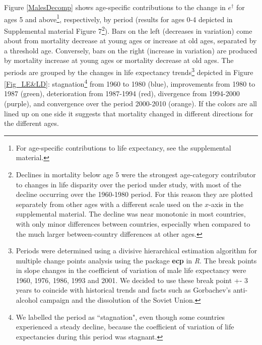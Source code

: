 \documentclass{article}
\begin{document}
\begin{spacing}{1.5}
Figure  \ref{MalesDecomp} shows age-specific contributions to the change in $e^\dagger$ for ages 5 and above\footnote{For age-specific contributions to life expectancy, see the supplemental material.}, respectively, by period (results for ages 0-4 depicted in Supplemental material Figure 7\footnote{Declines in mortality below age 5 were the strongest age-category contributor to changes in life disparity over the period under study, with most of the decline occurring over the 1960-1980 period. For this reason they are plotted separately from other ages with a different scale used on the $x$-axis in the supplemental material. The decline was near monotonic in most countries, with only minor differences between countries, especially when compared to the much larger between-country differences at other ages.}). Bars on the left (decreases in variation) come about from mortality decrease at young ages or increase at old ages, separated by a threshold age. Conversely, bars on the right (increase in variation) are produced by mortality increase at young ages or mortality decrease at old ages. The periods are grouped by the changes in life expectancy trends\footnote{Periods were determined using a divisive hierarchical estimation algorithm for multiple change points analysis using the package \textbf{ecp} in \textit{R}. The break points in slope changes in the coefficient of variation of male life expectancy were 1960, 1976, 1986, 1993 and 2001. We decided to use these break point +- 3 years to coincide with historical trends and facts such as Gorbachev's anti-alcohol campaign and the dissolution of the Soviet Union.} depicted in Figure \ref{Fig_LE&LD}: stagnation\footnote{We labelled the period as ``stagnation", even though some countries experienced a steady decline, because the coefficient of variation of life expectancies during this period was stagnant.} from 1960 to 1980 (blue), improvements from 1980 to 1987 (green), deterioration from 1987-1994 (red), divergence from 1994-2000 (purple), and convergence over the period 2000-2010 (orange). If the colors are all lined up on one side it suggests that mortality changed in different directions for the different ages. \\



\end{spacing}
\end{document}
